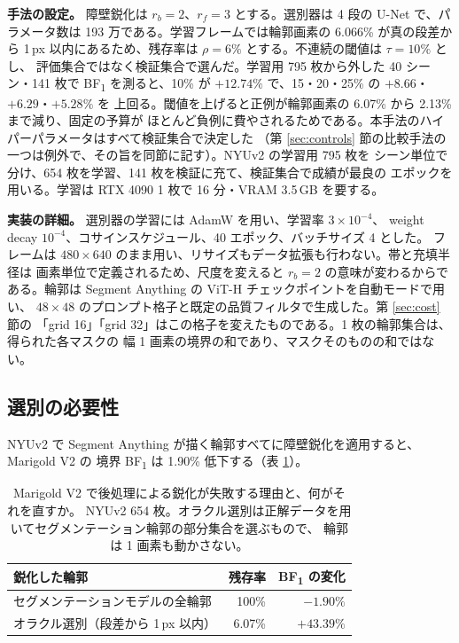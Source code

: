 \documentclass[conference]{IEEEtran}
\newcommand{\bfone}{BF\textsubscript{1}}
\begin{document}
\textbf{手法の設定。} 障壁鋭化は $r_b = 2$、$r_f = 3$ とする。選別器は 4 段の
U-Net で、パラメータ数は 193 万である。学習フレームでは輪郭画素の 6.066\% が真の段差から
1\,px 以内にあるため、残存率は $\rho = 6\%$ とする。不連続の閾値は $\tau = 10\%$ とし、
評価集合ではなく検証集合で選んだ。学習用 795 枚から外した 40 シーン・141 枚で
\bfone{} を測ると、10\% が $+12.74\%$ で、15・20・25\% の $+8.66$・$+6.29$・$+5.28\%$ を
上回る。閾値を上げると正例が輪郭画素の 6.07\% から 2.13\% まで減り、固定の予算が
ほとんど負例に費やされるためである。本手法のハイパーパラメータはすべて検証集合で決定した
（第 \ref{sec:controls} 節の比較手法の一つは例外で、その旨を同節に記す）。NYUv2 の学習用 795 枚を
シーン単位で分け、654 枚を学習、141 枚を検証に充て、検証集合で成績が最良の
エポックを用いる。学習は RTX 4090 1 枚で 16 分・VRAM 3.5\,GB を要する。

\textbf{実装の詳細。} 選別器の学習には AdamW を用い、学習率 $3 \times 10^{-4}$、
weight decay $10^{-4}$、コサインスケジュール、40 エポック、バッチサイズ 4 とした。
フレームは $480 \times 640$ のまま用い、リサイズもデータ拡張も行わない。帯と充填半径は
画素単位で定義されるため、尺度を変えると $r_b = 2$ の意味が変わるからである。輪郭は
Segment Anything \cite{sam} の ViT-H チェックポイントを自動モードで用い、
$48 \times 48$ のプロンプト格子と既定の品質フィルタで生成した。第 \ref{sec:cost} 節の
「grid 16」「grid 32」はこの格子を変えたものである。1 枚の輪郭集合は、得られた各マスクの
幅 1 画素の境界の和であり、マスクそのものの和ではない。

\subsection{選別の必要性}
\label{sec:why}
\label{sec:gtsel}

NYUv2 で Segment Anything が描く輪郭すべてに障壁鋭化を適用すると、Marigold V2 の
境界 \bfone{} は 1.90\% 低下する（表 \ref{tab:diagnosis}）。

\begin{table}[t]
\caption{Marigold V2 で後処理による鋭化が失敗する理由と、何がそれを直すか。
\textnormal{NYUv2} 654 枚。オラクル選別は正解データを用いてセグメンテーション輪郭の部分集合を選ぶもので、
輪郭は 1 画素も動かさない。}
\label{tab:diagnosis}
\centering
\begin{tabular}{lrr}
\toprule
鋭化した輪郭 & 残存率 & \bfone{} の変化 \\
\midrule
セグメンテーションモデルの全輪郭 & 100\% & $-1.90\%$ \\
オラクル選別（段差から 1\,px 以内） & 6.07\% & $\mathbf{+43.39\%}$ \\
\bottomrule
\end{tabular}
\end{table}
\end{document}

